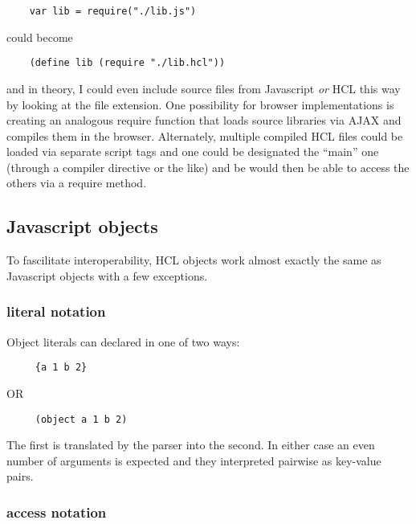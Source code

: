 \documentclass[11pt]{article}
\begin{document}
\begin{verbatim}
    var lib = require("./lib.js")
\end{verbatim}

   
   could become
   
\begin{verbatim}
    (define lib (require "./lib.hcl"))
\end{verbatim}

   
   and in theory, I could even include source files from Javascript \emph{or} HCL
   this way by looking at the file extension.  One possibility for browser
   implementations is creating an analogous require function that loads source
   libraries via AJAX and compiles them in the browser.  Alternately, multiple
   compiled HCL files could be loaded via separate script tags and one could be
   designated the ``main'' one (through a compiler directive or the like) and be
   would then be able to access the others via a require method.
   
\subsection{Javascript objects}
\label{sec-1.3}

   To fascilitate interoperability, HCL objects work almost exactly
   the same as Javascript objects with a few exceptions.
   
\subsubsection{literal notation}
\label{sec-1.3.1}

    Object literals can declared in one of two ways:
    
\begin{verbatim}
     {a 1 b 2}
\end{verbatim}

    
    OR
    
\begin{verbatim}
     (object a 1 b 2)
\end{verbatim}

    
    The first is translated by the parser into the second.  In either
    case an even number of arguments is expected and they interpreted
    pairwise as key-value pairs.
    
\subsubsection{access notation}
\label{sec-1.3.2}
\end{document}
